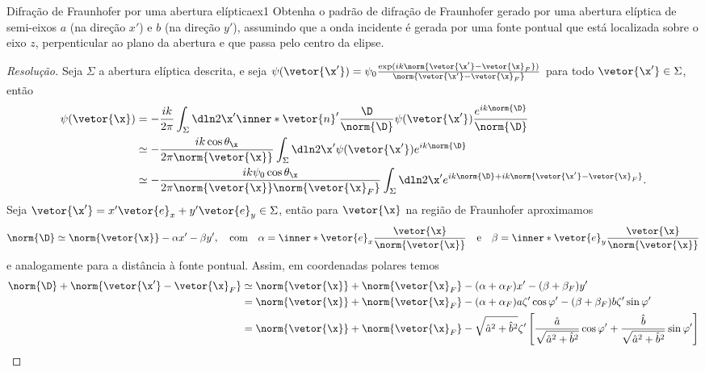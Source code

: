 \begin{exercício}{Difração de Fraunhofer por uma abertura elíptica}{ex1}
    Obtenha o padrão de difração de Fraunhofer gerado por uma abertura elíptica de semi-eixos \(a\) (na direção \(x'\)) e \(b\) (na direção \(y'\)), assumindo que a onda incidente é gerada por uma fonte pontual que está localizada sobre o eixo \(z\), perpenticular ao plano da abertura e que passa pelo centro da elipse.
\end{exercício}
\begin{proof}[Resolução]
    Seja \(\Sigma\) a abertura elíptica descrita, e seja \(\psi(\vetor{\x'}) = \psi_0 \frac{\exp(ik\norm{\vetor{\x'} - \vetor{\x}_F})}{\norm{\vetor{\x'} - \vetor{\x}_F}}\) para todo \(\vetor{\x'}\in \Sigma\), então 
    \begin{align*}
        \psi(\vetor{\x}) &= - \frac{i k}{2\pi} \int_{\Sigma} \dln2{\x'} \inner*{\vetor{n}'}{\frac{\D}{\norm{\D}}} \psi(\vetor{\x'}) \frac{e^{ik \norm{\D}}}{\norm{\D}}\\
                         &\simeq -\frac{ik \cos\theta_{\x}}{2\pi \norm{\vetor{\x}}} \int_{\Sigma} \dln2{\x'} \psi(\vetor{\x'}) e^{ik \norm{\D}}\\
                         &\simeq -\frac{ik \psi_0 \cos\theta_{\x}}{2\pi \norm{\vetor{\x}} \norm{\vetor{\x}_F}} \int_{\Sigma} \dln2{\x'} e^{ik \norm{\D} + ik \norm{\vetor{\x'} - \vetor{\x}_F}}.
    \end{align*}
    Seja \(\vetor{\x'} = x' \vetor{e}_x + y' \vetor{e}_y \in \Sigma\), então para \(\vetor{\x}\) na região de Fraunhofer aproximamos
    \begin{equation*}
        \norm{\D} \simeq \norm{\vetor{\x}} - \alpha x' - \beta y',\quad\text{com}\quad \alpha = \inner*{\vetor{e}_x}{\frac{\vetor{\x}}{\norm{\vetor{\x}}}}\quad\text{e}\quad\beta = \inner*{\vetor{e}_y}{\frac{\vetor{\x}}{\norm{\vetor{\x}}}}
    \end{equation*}
    e analogamente para a distância à fonte pontual. Assim, em coordenadas polares temos
    \begin{align*}
        \norm{\D} + \norm{\vetor{\x'} - \vetor{\x}_F} &\simeq \norm{\vetor{\x}} + \norm{\vetor{\x}_F} - (\alpha + \alpha_F) x' - (\beta + \beta_F)y'\\
                                                      &= \norm{\vetor{\x}} + \norm{\vetor{\x}_F} - (\alpha + \alpha_F) a \zeta' \cos\varphi' - (\beta + \beta_F) b \zeta' \sin\varphi'\\
                                                      &= \norm{\vetor{\x}} + \norm{\vetor{\x}_F} - {\sqrt{\hat{a}^2 + \hat{b}^2}}\zeta'\left[\frac{\hat{a}}{\sqrt{\hat{a}^2 + \hat{b}^2}} \cos\varphi' + \frac{\hat{b}}{\sqrt{\hat{a}^2 + \hat{b}^2}} \sin\varphi'\right]\\

\end{align*}
\end{proof}
